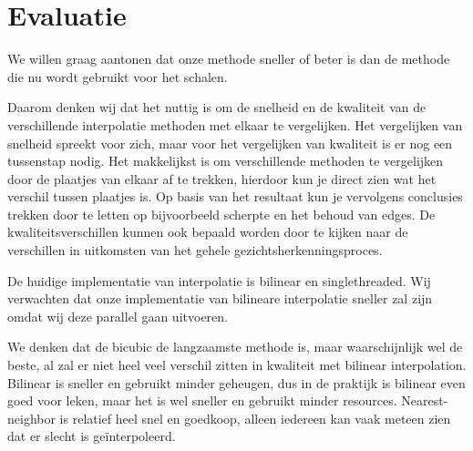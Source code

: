 \documentclass[a4paper]{article}
\begin{document}
\section{Evaluatie}
\label{sec:org51255b1}
We willen graag aantonen dat onze methode sneller of beter
is dan de methode die nu wordt gebruikt voor het schalen.

Daarom denken wij dat het nuttig is om de snelheid en de kwaliteit van
de verschillende interpolatie methoden met elkaar te vergelijken. Het
vergelijken van snelheid spreekt voor zich, maar voor het vergelijken
van kwaliteit is er nog een tussenstap nodig. Het makkelijkst is om
verschillende methoden te vergelijken door de plaatjes van elkaar af
te trekken, hierdoor kun je direct zien wat het verschil tussen
plaatjes is. Op basis van het resultaat kun je vervolgens conclusies
trekken door te letten op bijvoorbeeld scherpte en het behoud van
edges. De kwaliteitsverschillen kunnen ook bepaald worden door te
kijken naar de verschillen in uitkomsten van het gehele
gezichtsherkenningsproces.

De huidige implementatie van interpolatie is bilinear en
singlethreaded. Wij verwachten dat onze implementatie van bilineare
interpolatie sneller zal zijn omdat wij deze parallel gaan uitvoeren.

We denken dat de bicubic de langzaamste methode is, maar
waarschijnlijk wel de beste, al zal er niet heel veel verschil zitten
in kwaliteit met bilinear interpolation. Bilinear is sneller en gebruikt minder geheugen, dus in de praktijk is bilinear even goed voor leken, maar het is wel sneller en gebruikt minder resources. Nearest-neighbor is relatief heel snel en goedkoop, alleen iedereen kan vaak meteen zien dat er slecht is geïnterpoleerd.
\end{document}
